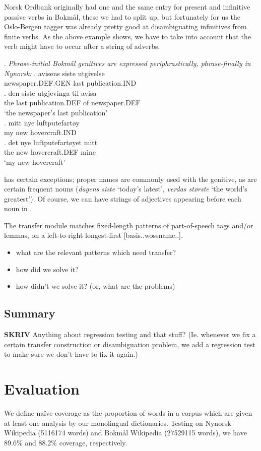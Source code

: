 \documentclass[11pt]{article}
\begin{document}
Norsk Ordbank originally had one and the same entry for present and
infinitive passive verbs in Bokmål, these we had to split up, but
fortunately for us the Oslo-Bergen tagger was already pretty good at
disambiguating infinitives from finite verbs. As the above example
shows, we have to take into account that the verb might have to occur
after a string of adverbs.

\ex. \emph{Phrase-initial Bokmål genitives are expressed
  periphrastically, phrase-finally in Nynorsk:}
\ag. avisens siste utgivelse\\
newspaper.DEF.GEN last publication.IND\\
\bg. den siste utgjevinga til avisa\\
the last publication.DEF of newspaper.DEF\\
`the newspaper's last publication'\\
\cg. mitt nye luftputefartøy\\
my new hovercraft.IND\\
\dg. det nye luftputefartøyet mitt\\
the new hovercraft.DEF mine\\
`my new hovercraft'

\Last has certain exceptions; proper names are commonly used with the
genitive, as are certain frequent nouns (\emph{dagens siste} `today's
latest', \emph{verdas største} `the world's
greatest'). Of course, we can have strings of adjectives appearing
before each noun in \Last[a, b].

The transfer module matches fixed-length patterns of part-of-speech
tags and/or lemmas, on a left-to-right longest-first
[basis..wossname..]. 

\begin{itemize}
\item what are the relevant patterns which need transfer?
\item how did we solve it?
\item how didn't we solve it? (or, what are the problems)
\end{itemize}
\subsection{Summary}
\textbf{SKRIV}
Anything about regression testing and that stuff? (Ie. whenever we
  fix a certain transfer construction or disambiguation problem, we
  add a regression test to make sure we don't have to fix it again.)

\section{Evaluation}
 \label{SEC:eval}
We define naïve coverage as the proportion of words in a corpus which
are given at least one analysis by our monolingual
dictionaries. Testing on Nynorsk Wikipedia (5116174 words) and Bokmål
Wikipedia (27529115 words), we have 89.6\% and 88.2\% coverage,
respectively.
\end{document}
